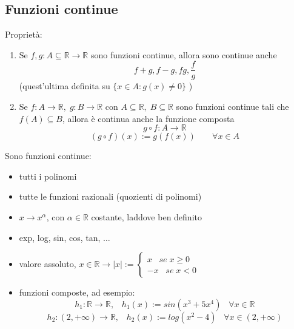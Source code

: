 \documentclass[a4paper]{article}
\theoremstyle{break}
\theoremstyle{break}
\theoremstyle{break}
\theoremstyle{break}
\begin{document}
\subsection{Funzioni continue}

Proprietà:
\begin{enumerate}
	\item Se \( f,g: A \subseteq \mathbb{R} \to  \mathbb{R} \) sono funzioni continue, allora sono continue anche
	      \[
		      f+g, f-g, fg, \frac{f}{g}
	      \]
	      (quest'ultima definita su \( \{x \in A: g(x) \neq 0\}  \) )
	\item Se \( f: A \to \mathbb{R},\;g: B \to \mathbb{R} \) con \( A \subseteq \mathbb{R},\; B \subseteq \mathbb{R} \)
	      sono funzioni continue tali che \( f(A) \subseteq B \), allora è continua anche la funzione composta
	      \[
		      g \circ f: A \to \mathbb{R}
	      \]
	      \[
		      (g \circ f)(x) := g(f(x))\;\;\;\;\;\;\; \forall x \in A
	      \]
\end{enumerate}
\begin{example}
	Sono funzioni continue:
	\begin{itemize}
		\item tutti i polinomi
		\item tutte le funzioni razionali (quozienti di polinomi)
		\item \( x \to x^\alpha \), con \( \alpha \in \mathbb{R} \) costante, laddove ben definito
		\item exp, log, sin, cos, tan, \( \ldots \)
		\item valore assoluto, \( x \in \mathbb{R} \to |x|:= \begin{cases}
			      x\;\;\; se\; x \ge 0 \\
			      -x\;\;\; se\; x < 0
		      \end{cases} \)
		\item funzioni composte, ad esempio:
		      \[
			      h_1: \mathbb{R} \to \mathbb{R},\;\;\; h_1(x):=sin(x^3 + 5x^4)\;\;\; \forall x \in \mathbb{R}
		      \]
		      \[
			      h_2:(2, +\infty) \to \mathbb{R}, \;\;\; h_2(x):=log(x^2-4)\;\;\; \forall x \in (2, +\infty)
		      \]
	\end{itemize}
\end{example}
\end{document}
